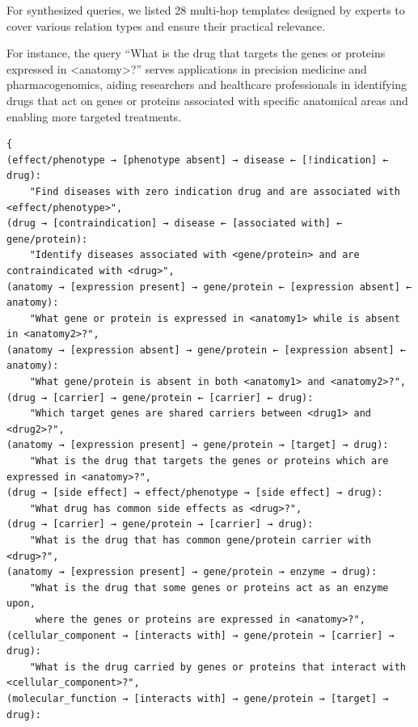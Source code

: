  For synthesized queries, we listed 28 multi-hop templates designed by experts to cover various relation types and ensure their practical relevance. 

For instance, the query ``What is the drug that targets the genes or proteins expressed in <anatomy>?'' serves applications in precision medicine and pharmacogenomics, 
aiding researchers and healthcare professionals in identifying drugs that act on genes or proteins associated with specific anatomical areas and enabling more targeted treatments. 

\vspace{10pt}
\begin{mdframed}[backgroundcolor=gray!5, linecolor=black, linewidth=2pt, innerleftmargin=10pt, innerrightmargin=10pt, innertopmargin=3pt, innerbottommargin=10pt]
\begin{scriptsize}
\begin{verbatim}
{   
(effect/phenotype → [phenotype absent] → disease ← [!indication] ← drug): 
    "Find diseases with zero indication drug and are associated with <effect/phenotype>",
(drug → [contraindication] → disease ← [associated with] ← gene/protein): 
    "Identify diseases associated with <gene/protein> and are contraindicated with <drug>",
(anatomy → [expression present] → gene/protein ← [expression absent] ← anatomy): 
    "What gene or protein is expressed in <anatomy1> while is absent in <anatomy2>?",
(anatomy → [expression absent] → gene/protein ← [expression absent] ← anatomy): 
    "What gene/protein is absent in both <anatomy1> and <anatomy2>?",
(drug → [carrier] → gene/protein ← [carrier] ← drug): 
    "Which target genes are shared carriers between <drug1> and <drug2>?",
(anatomy → [expression present] → gene/protein → [target] → drug): 
    "What is the drug that targets the genes or proteins which are expressed in <anatomy>?",
(drug → [side effect] → effect/phenotype → [side effect] → drug): 
    "What drug has common side effects as <drug>?",
(drug → [carrier] → gene/protein → [carrier] → drug): 
    "What is the drug that has common gene/protein carrier with <drug>?",
(anatomy → [expression present] → gene/protein → enzyme → drug): 
    "What is the drug that some genes or proteins act as an enzyme upon, 
     where the genes or proteins are expressed in <anatomy>?",
(cellular_component → [interacts with] → gene/protein → [carrier] → drug): 
    "What is the drug carried by genes or proteins that interact with <cellular_component>?",
(molecular_function → [interacts with] → gene/protein → [target] → drug): 

\end{verbatim}
\end{scriptsize}
\end{mdframed}
